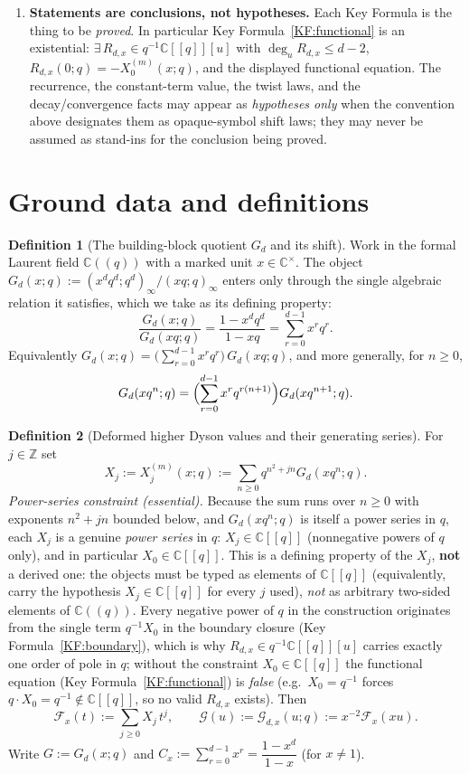 \documentclass[11pt]{article}
\newcommand{\C}{\mathbb{C}}
\newcommand{\Z}{\mathbb{Z}}
\newcommand{\GG}{\mathcal{G}}
\newcommand{\FF}{\mathcal{F}}
\theoremstyle{definition}
\newtheorem{defn}{Definition}
\begin{document}
\begin{enumerate}
\item[(C6)] \textbf{Statements are conclusions, not hypotheses.} Each Key Formula is the thing
to be \emph{proved}. In particular Key Formula~\ref{KF:functional} is an existential:
$\exists\,R_{d,x}\in q^{-1}\C[[q]][u]$ with $\deg_u R_{d,x}\le d-2$, $R_{d,x}(0;q)=-X_0^{(m)}(x;q)$,
and the displayed functional equation. The recurrence, the constant-term value, the twist
laws, and the decay/convergence facts may appear as \emph{hypotheses only} when the
convention above designates them as opaque-symbol shift laws; they may never be assumed as
stand-ins for the conclusion being proved.
\end{enumerate}

\section*{Ground data and definitions}

\begin{defn}[The building-block quotient $G_d$ and its shift]\label{def:G}
Work in the formal Laurent field $\C((q))$ with a marked unit $x\in\C^\times$. The object
$G_d(x;q):=(x^dq^d;q^d)_\infty/(xq;q)_\infty$ enters only through the single algebraic relation
it satisfies, which we take as its defining property:
\[
\frac{G_d(x;q)}{G_d(xq;q)}=\frac{1-x^dq^d}{1-xq}
=\sum_{r=0}^{d-1}x^rq^r .
\]
Equivalently $G_d(x;q)=\bigl(\sum_{r=0}^{d-1}x^rq^r\bigr)\,G_d(xq;q)$, and more generally, for
$n\ge0$,
\[
G_d(xq^n;q)=\Bigl(\sum_{r=0}^{d-1}x^rq^{r(n+1)}\Bigr)G_d(xq^{n+1};q).
\]
\end{defn}

\begin{defn}[Deformed higher Dyson values and their generating series]\label{def:X}
For $j\in\Z$ set
\[
X_j:=X_j^{(m)}(x;q):=\sum_{n\ge0}q^{n^2+jn}G_d(xq^n;q).
\]
\emph{Power-series constraint (essential).} Because the sum runs over $n\ge0$ with exponents
$n^2+jn$ bounded below, and $G_d(xq^n;q)$ is itself a power series in $q$, each $X_j$ is a
genuine \emph{power series} in $q$: $X_j\in\C[[q]]$ (nonnegative powers of $q$ only), and in
particular $X_0\in\C[[q]]$. This is a defining property of the $X_j$, \textbf{not} a derived
one: the objects must be typed as elements of $\C[[q]]$ (equivalently, carry the hypothesis
$X_j\in\C[[q]]$ for every $j$ used), \emph{not} as arbitrary two-sided elements of $\C((q))$.
Every negative power of $q$ in the construction originates from the single term $q^{-1}X_0$ in
the boundary closure (Key Formula~\ref{KF:boundary}), which is why $R_{d,x}\in q^{-1}\C[[q]][u]$
carries exactly one order of pole in $q$; without the constraint $X_0\in\C[[q]]$ the functional
equation (Key Formula~\ref{KF:functional}) is \emph{false} (e.g.\ $X_0=q^{-1}$ forces
$q\cdot X_0=q^{-1}\notin\C[[q]]$, so no valid $R_{d,x}$ exists). Then
\[
\FF_x(t):=\sum_{j\ge0}X_j\,t^j,
\qquad
\GG(u):=\GG_{d,x}(u;q):=x^{-2}\FF_x(xu).
\]
Write $G:=G_d(x;q)$ and $C_x:=\sum_{r=0}^{d-1}x^r=\dfrac{1-x^d}{1-x}$ (for $x\ne1$).
\end{defn}
\end{document}
